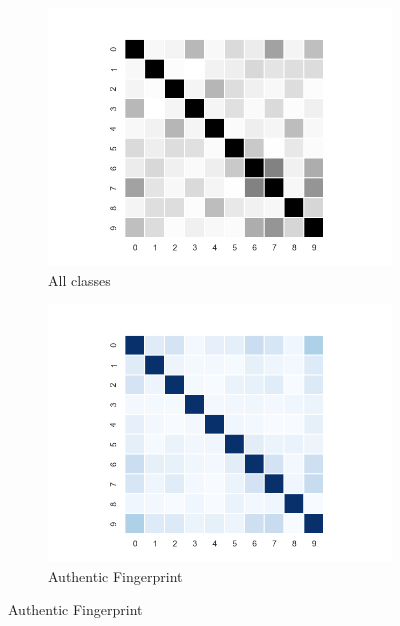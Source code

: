 \documentclass[english]{report}
\begin{document}
\begin{figure}[h!]
    \begin{subfigure}{0.3\textwidth}
        \includegraphics[scale=0.3]{../../images/feature_plot/heatmap_.png}
        \caption{All classes}
        
        \label{fig:heatmap}
    \end{subfigure}
    \begin{subfigure}{0.3\textwidth}
        \includegraphics[scale=0.3]{../../images/feature_plot/heatmap_fingerprint_.png}
        \caption{Authentic Fingerprint}
        

\end{subfigure}
\end{figure}
\end{document}
